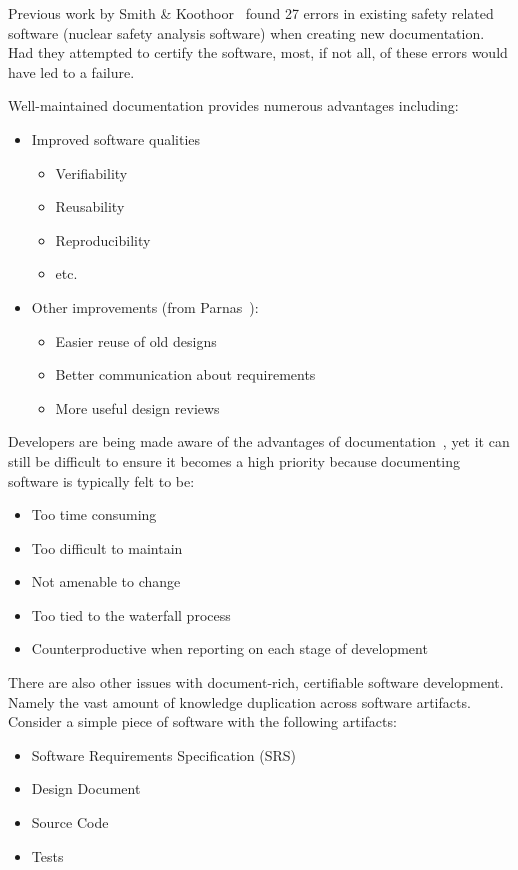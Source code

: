 \documentclass[sigconf]{acmart}
\begin{document}
Previous work by Smith \& Koothoor~\citep{SmithAndKoothoor2016} found 27 errors
in existing safety related software (nuclear safety analysis software) when
creating new documentation. Had they attempted to certify the software, most, if
not all, of these errors would have led to a failure.

Well-maintained documentation provides numerous advantages including:
\begin{itemize}
\item Improved software qualities 
	\begin{itemize}
	\item Verifiability
	\item Reusability
	\item Reproducibility
	\item etc.
	\end{itemize}

\item Other improvements (from Parnas~\cite{Parnas2010}):
	\begin{itemize}
		\item Easier reuse of old designs
		\item Better communication about requirements
		\item More useful design reviews
	\end{itemize}
\end{itemize}

Developers are being made aware of the advantages of 
documentation~\cite{SmithJegatheesanAndKelly2016}, yet it can still be difficult 
to ensure it becomes a high priority because documenting software is typically 
felt to be:

\begin{itemize}
\item Too time consuming
\item Too difficult to maintain
\item Not amenable to change
\item Too tied to the waterfall process
\item Counterproductive when reporting on each stage of 
		development~\cite{Roache1998}
\end{itemize}

There are also other issues with document-rich, certifiable software 
development. Namely the vast amount of knowledge duplication across software 
artifacts. Consider a simple piece of software with the following artifacts:

\begin{itemize}
\item Software Requirements Specification (SRS)
\item Design Document
\item Source Code
\item Tests
\end{itemize}
\end{document}
